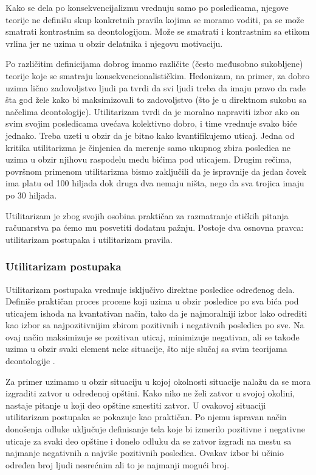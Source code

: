 \documentclass[a4paper]{article}
\begin{document}
Kako se dela po konsekvencijalizmu vrednuju samo po posledicama, njegove teorije ne definišu skup konkretnih pravila kojima se moramo voditi, pa se može smatrati kontrastnim sa deontologijom. Može se smatrati i kontrastnim sa etikom vrlina jer ne uzima u obzir delatnika i njegovu motivaciju. 

Po različitim definicijama dobrog imamo različite (često međusobno sukobljene) teorije koje se smatraju konsekvencionalističkim. Hedonizam, na primer, za dobro uzima lično zadovoljstvo ljudi pa tvrdi da svi ljudi treba da imaju pravo da rade šta god žele kako bi maksimizovali to zadovoljstvo \cite{hedonism-iep} (što je u direktnom sukobu sa načelima deontologije). Utilitarizam tvrdi da je moralno napraviti izbor ako on svim svojim posledicama uvećava kolektivno dobro, i time vrednuje svako biće jednako. Treba uzeti u obzir da je bitno kako kvantifikujemo uticaj. Jedna od kritika utilitarizma je činjenica da merenje samo ukupnog zbira posledica ne uzima u obzir njihovu raspodelu među bićima pod uticajem. Drugim rečima, površnom primenom utilitarizma bismo zaključili da je ispravnije da jedan čovek ima platu od 100 hiljada dok druga dva nemaju ništa, nego da sva trojica imaju po 30 hiljada. 

Utilitarizam je zbog svojih osobina praktičan za razmatranje etičkih pitanja računarstva pa ćemo mu posvetiti dodatnu pažnju. Postoje dva osnovna pravca: utilitarizam postupaka i utilitarizam pravila. 

\subsubsection{Utilitarizam postupaka}
Utilitarizam postupaka vrednuje isključivo direktne posledice određenog dela. Definiše praktičan proces procene koji uzima u obzir posledice po sva bića pod uticajem ishoda na kvantativan način, tako da je najmoralniji izbor lako odrediti kao izbor sa najpozitivnijim zbirom pozitivnih i negativnih posledica po sve. Na ovaj način maksimizuje se pozitivan uticaj, minimizuje negativan, ali se takođe uzima u obzir svaki element neke situacije, što nije slučaj sa svim teorijama deontologije \cite{quinn-ethics}. 

Za primer uzimamo u obzir situaciju u kojoj okolnosti situacije nalažu da se mora izgraditi zatvor u određenoj opštini. Kako niko ne želi zatvor u svojoj okolini, nastaje pitanje u koji deo opštine smestiti zatvor. U ovakovoj situaciji utilitarizam postupaka se pokazuje kao praktičan. Po njemu ispravan način donošenja odluke uključuje definisanje tela koje bi izmerilo pozitivne i negativne uticaje za svaki deo opštine i donelo odluku da se zatvor izgradi na mestu sa najmanje negativnih a najviše pozitivnih posledica. Ovakav izbor bi učinio određen broj ljudi nesrećnim ali to je najmanji mogući broj. 
\end{document}
